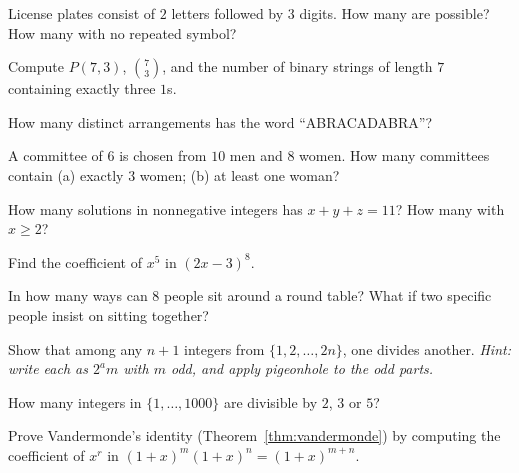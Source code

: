 \begin{exercise}{\easy}
License plates consist of $2$ letters followed by $3$ digits. How many are
possible? How many with no repeated symbol?
\end{exercise}

\begin{exercise}{\easy}
Compute $P(7,3)$, $\binom{7}{3}$, and the number of binary strings of length
$7$ containing exactly three $1$s.
\end{exercise}

\begin{exercise}{\easy}
How many distinct arrangements has the word ``ABRACADABRA''?
\end{exercise}

\begin{exercise}{\medium}
A committee of $6$ is chosen from $10$ men and $8$ women. How many
committees contain (a) exactly $3$ women; (b) at least one woman?
\end{exercise}

\begin{exercise}{\medium}
How many solutions in nonnegative integers has $x + y + z = 11$? How many
with $x \geq 2$?
\end{exercise}

\begin{exercise}{\medium}
Find the coefficient of $x^{5}$ in $(2x - 3)^{8}$.
\end{exercise}

\begin{exercise}{\medium}
In how many ways can $8$ people sit around a round table? What if two
specific people insist on sitting together?
\end{exercise}

\begin{exercise}{\medium}
Show that among any $n + 1$ integers from $\{1, 2, \ldots, 2n\}$, one
divides another. \emph{Hint: write each as $2^a m$ with $m$ odd, and apply
pigeonhole to the odd parts.}
\end{exercise}

\begin{exercise}{\medium}
How many integers in $\{1, \ldots, 1000\}$ are divisible by $2$, $3$ or
$5$?
\end{exercise}

\begin{exercise}{\hard}
Prove Vandermonde's identity (Theorem~\ref{thm:vandermonde}) by computing
the coefficient of $x^{r}$ in $(1+x)^{m}(1+x)^{n} = (1+x)^{m+n}$.
\end{exercise}

